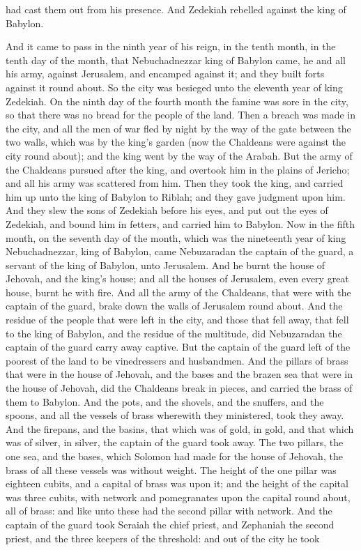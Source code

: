 had cast them out from his presence. And Zedekiah rebelled against the king of Babylon. 

And it came to pass in the ninth year of his reign, in the tenth month, in the tenth day of the month, that Nebuchadnezzar king of Babylon came, he and all his army, against Jerusalem, and encamped against it; and they built forts against it round about. So the city was besieged unto the eleventh year of king Zedekiah. On the ninth day of the fourth month the famine was sore in the city, so that there was no bread for the people of the land. Then a breach was made in the city, and all the men of war fled by night by the way of the gate between the two walls, which was by the king’s garden (now the Chaldeans were against the city round about); and the king went by the way of the Arabah. But the army of the Chaldeans pursued after the king, and overtook him in the plains of Jericho; and all his army was scattered from him. Then they took the king, and carried him up unto the king of Babylon to Riblah; and they gave judgment upon him. And they slew the sons of Zedekiah before his eyes, and put out the eyes of Zedekiah, and bound him in fetters, and carried him to Babylon.  Now in the fifth month, on the seventh day of the month, which was the nineteenth year of king Nebuchadnezzar, king of Babylon, came Nebuzaradan the captain of the guard, a servant of the king of Babylon, unto Jerusalem. And he burnt the house of Jehovah, and the king’s house; and all the houses of Jerusalem, even every great house, burnt he with fire. And all the army of the Chaldeans, that were with the captain of the guard, brake down the walls of Jerusalem round about. And the residue of the people that were left in the city, and those that fell away, that fell to the king of Babylon, and the residue of the multitude, did Nebuzaradan the captain of the guard carry away captive. But the captain of the guard left of the poorest of the land to be vinedressers and husbandmen.  And the pillars of brass that were in the house of Jehovah, and the bases and the brazen sea that were in the house of Jehovah, did the Chaldeans break in pieces, and carried the brass of them to Babylon. And the pots, and the shovels, and the snuffers, and the spoons, and all the vessels of brass wherewith they ministered, took they away. And the firepans, and the basins, that which was of gold, in gold, and that which was of silver, in silver, the captain of the guard took away. The two pillars, the one sea, and the bases, which Solomon had made for the house of Jehovah, the brass of all these vessels was without weight. The height of the one pillar was eighteen cubits, and a capital of brass was upon it; and the height of the capital was three cubits, with network and pomegranates upon the capital round about, all of brass: and like unto these had the second pillar with network.  And the captain of the guard took Seraiah the chief priest, and Zephaniah the second priest, and the three keepers of the threshold: and out of the city he took 